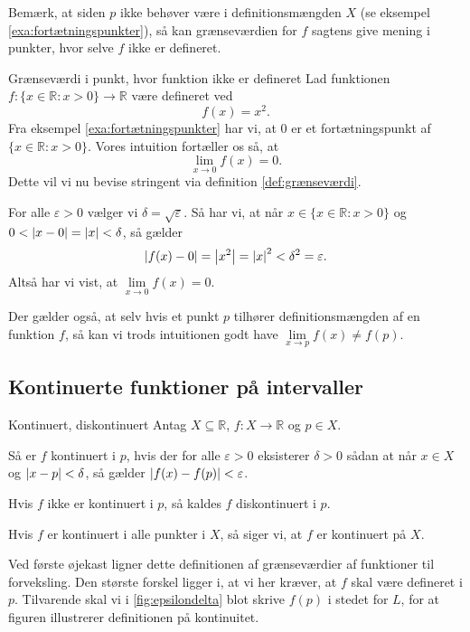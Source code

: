 Bemærk, at siden $p$ ikke behøver være i definitionsmængden $X$ (se eksempel \ref{exa:fortætningspunkter}), så kan grænseværdien for $f$ sagtens give mening i punkter, hvor selve $f$ ikke er defineret.

\begin{example}[label=exa:grænseværdi]{Grænseværdi i punkt, hvor funktion ikke er defineret}{}
 Lad funktionen $f:\{ x \in \mathbb{R}:x>0 \} \to \mathbb{R}$ være defineret ved
  \[
  f(x)= x^2.
  \] 
  Fra eksempel \ref{exa:fortætningspunkter} har vi, at $0$ er et fortætningspunkt af $\{ x \in \mathbb{R}:x>0 \} $. 
  Vores intuition fortæller os så, at
  \[
  \lim_{x \to 0} f(x)= 0.
  \] 
  Dette vil vi nu bevise stringent via definition \ref{def:grænseværdi}.

  For alle $\varepsilon >0$ vælger vi $\delta =\sqrt{\varepsilon } $. 
  Så har vi, at når $x \in \{ x \in \mathbb{R}:x>0 \} $ og $0<\abs{x-0} =\abs{x} <\delta $, så gælder
  \[
    \abs{f(x)-0} =\abs{x^2}=\abs{x}^2<\delta ^2=\varepsilon.
  \] 
  Altså har vi vist, at $\lim\limits_{x \to 0}f(x)=0$.
\end{example}

Der gælder også, at selv hvis et punkt $p$ tilhører definitionsmængden af en funktion $f$, så kan vi trods intuitionen godt have $\lim\limits_{x \to p} f(x) \neq f(p)$.

\subsection{Kontinuerte funktioner på intervaller}%
\label{sub:Kontinuert}


\begin{definition}[label=def:kontinuert]{Kontinuert, diskontinuert}{}
 Antag $X \subseteq \mathbb{R}$, $f:X \to \mathbb{R}$ og $p \in X$.

  Så er $f$ kontinuert i $p$, hvis der for alle $\varepsilon >0$ eksisterer $\delta >0$ sådan at når $x \in X$ og $\abs{x-p} < \delta  $, så gælder $\abs{f(x)-f(p)}<\varepsilon $. 

  Hvis $f$ ikke er kontinuert i $p$, så kaldes $f$ diskontinuert i $p$. 

  Hvis $f$ er kontinuert i alle punkter i $X$, så siger vi, at $f$ er kontinuert på $X$. 
\end{definition}

Ved første øjekast ligner dette definitionen af grænseværdier af funktioner til forveksling.
Den største forskel ligger i, at vi her kræver, at $f$ skal være defineret i $p$. 
Tilvarende skal vi i \cref{fig:epsilondelta} blot skrive $f(p)$ i stedet for $L$, for at figuren illustrerer definitionen på kontinuitet. 

